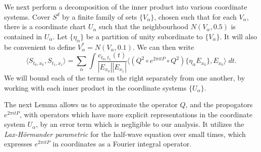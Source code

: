 We next perform a decomposition of the inner product into various coordinate systems. Cover $S^d$ by a finite family of sets $\{ V_\alpha \}$, chosen such that for each $V_\alpha$, there is a coordinate chart $U_\alpha$ such that the neighbourhood $N(V_\alpha, 0.5)$ is contained in $U_\alpha$. Let $\{ \eta_\alpha \}$ be a partition of unity subordinate to $\{ V_\alpha \}$. It will also be convenient to define $V_\alpha^* = N(V_\alpha, 0.1)$. We can then write
%
\[ \langle S_{t_0,x_0}, S_{t_1,x_1} \rangle = \sum_\alpha \int \frac{c_{t_0,t_1}(t)}{|E_{x_0}||E_{x_1}|} \big\langle (Q^2 \circ e^{2 \pi i t P} \circ Q^2) \{ \eta_\alpha E_{x_0} \}, E_{x_0} \big\rangle\; dt. \]
%
We will bound each of the terms on the right separately from one another, by working with each inner product in the coordinate systems $\{ U_\alpha \}$.

The next Lemma allows us to approximate the operator $Q$, and the propogators $e^{2 \pi i t P}$, with operators which have more explicit representations in the coordinate system $U_\alpha$, by an error term which is negligible to our analysis. It utilizes the \emph{Lax-H\"{o}rmander parametric} for the half-wave equation over small times, which expresses $e^{2 \pi i t P}$ in coordinates as a Fourier integral operator.


